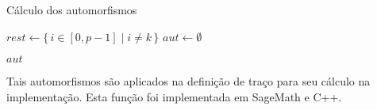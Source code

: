 \begin{algorithm}[H]
\caption{Cálculo dos automorfismos}

$rest \gets \{\, i \in [0, p-1] \mid i \neq k \,\}$ \;
$aut \gets \emptyset$ \;

\Return $aut$
\end{algorithm}

Tais automorfismos são aplicados na definição de traço para seu cálculo na implementação. Esta função foi implementada em SageMath e C++.